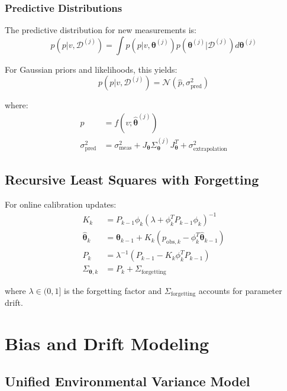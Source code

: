 \documentclass[11pt]{article}
\begin{document}
\subsubsection{Predictive Distributions}
The predictive distribution for new measurements is:
\begin{equation}
p(p|v,\mathcal{D}^{(j)}) = \int p(p|v,\bm{\theta}^{(j)}) p(\bm{\theta}^{(j)} | \mathcal{D}^{(j)}) d\bm{\theta}^{(j)}
\end{equation}

For Gaussian priors and likelihoods, this yields:
\begin{equation}
p(p|v,\mathcal{D}^{(j)}) = \mathcal{N}(\hat{p}, \sigma_{\text{pred}}^2)
\end{equation}

where:
\begin{align}
\hat{p} &= f(v; \hat{\bm{\theta}}^{(j)}) \\
\sigma_{\text{pred}}^2 &= \sigma_{\text{meas}}^2 + J_{\bm{\theta}} \Sigma_{\bm{\theta}}^{(j)} J_{\bm{\theta}}^T + \sigma_{\text{extrapolation}}^2
\end{align}

\subsection{Recursive Least Squares with Forgetting}

For online calibration updates:
\begin{align}
K_k &= P_{k-1} \phi_k (\lambda + \phi_k^T P_{k-1} \phi_k)^{-1} \\
\hat{\bm{\theta}}_k &= \hat{\bm{\theta}}_{k-1} + K_k (p_{\text{obs},k} - \phi_k^T \hat{\bm{\theta}}_{k-1}) \\
P_k &= \lambda^{-1}(P_{k-1} - K_k \phi_k^T P_{k-1}) \\
\Sigma_{\bm{\theta},k} &= P_k + \Sigma_{\text{forgetting}}
\end{align}

where $\lambda \in (0,1]$ is the forgetting factor and $\Sigma_{\text{forgetting}}$ accounts for parameter drift.

\section{Bias and Drift Modeling}

\subsection{Unified Environmental Variance Model}
\end{document}
